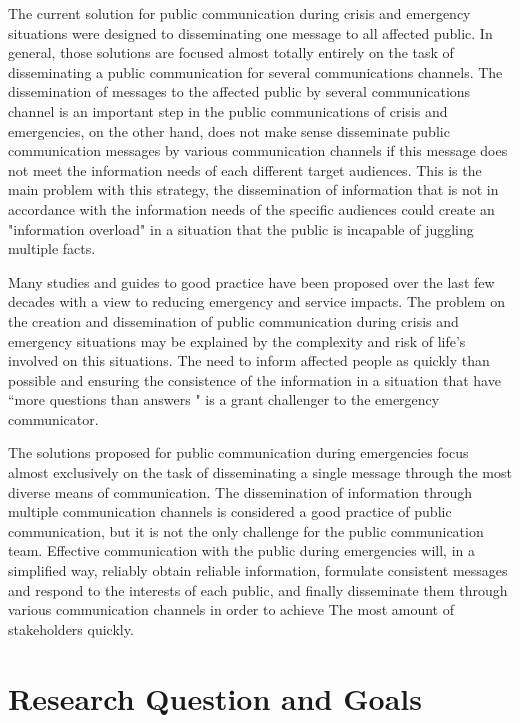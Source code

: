 The current solution for public communication during crisis and emergency situations were designed to disseminating one message to all affected public. In general, those solutions are focused almost totally entirely on the task of disseminating a public communication for several communications channels. The dissemination of messages to the affected public by several communications channel is an important step in the public communications of crisis and emergencies, on the other hand, does not make sense disseminate public communication messages by various communication channels if this message does not meet the information needs of each different target audiences. This is the main problem with this strategy, the dissemination of information that is not in accordance with the information needs of the specific audiences could create an "information overload" in a situation that the public is incapable of juggling multiple facts\cite{cdc2014}. 

Many studies and guides to good practice have been proposed over the last few decades with a view to reducing emergency and service impacts. The problem on the creation and dissemination of public communication during crisis and emergency situations may be explained by the complexity and risk of life's involved on this situations. The need to inform affected people as quickly than possible and ensuring the consistence of the information in a situation that have ``more questions than answers \cite{cdc2014}" is a grant challenger to the emergency communicator.

The solutions proposed for public communication during emergencies focus almost exclusively on the task of disseminating a single message through the most diverse means of communication. The dissemination of information through multiple communication channels is considered a good practice of public communication, but it is not the only challenge for the public communication team. Effective communication with the public during emergencies will, in a simplified way, reliably obtain reliable information, formulate consistent messages and respond to the interests of each public, and finally disseminate them through various communication channels in order to achieve The most amount of stakeholders quickly.

\section{Research Question and Goals}


